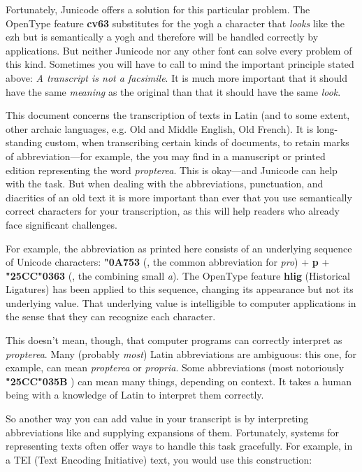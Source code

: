 Fortunately, Junicode offers a solution for this particular problem. The OpenType feature \textbf{cv63} substitutes for
the yogh a character that \textit{looks} like the ezh but is semantically a yogh and therefore will be
handled correctly by applications. But neither Junicode nor any other font can solve every problem of this kind.
Sometimes you will have to call to mind the important principle stated above: \textit{A transcript is not a
facsimile}. It is much more important that it should have the same \textit{meaning} as the original than
that it should have the same \textit{look}.

This document concerns the transcription of texts in Latin (and to some extent, other archaic languages, e.g. Old and
Middle English, Old French). It is long-standing custom, when transcribing certain kinds of documents, to retain marks
of abbreviation---for example, the \textbf{} you may find in a manuscript or printed edition representing
the word \textit{propterea}. This is okay---and Junicode can help with the task. But when dealing with the
abbreviations, punctuation, and diacritics of an old text it is more important than ever that you use semantically
correct characters for your transcription, as this will help readers who already face significant challenges.

For example, the abbreviation \textbf{} as printed here consists of an underlying sequence of Unicode
characters: \textbf{\char"0A753} (, the common abbreviation for \textit{pro}) + \textbf{p} + \textbf{\char"25CC\char"0363}
(, the combining small \textit{a}). The OpenType feature \textbf{hlig} (Historical Ligatures) has been
applied to this sequence, changing its appearance but not its underlying value. That underlying value is intelligible
to computer applications in the sense that they can recognize each character.

This doesn't mean, though, that computer programs can correctly interpret \textbf{} as
\textit{propterea}. Many (probably \textit{most}) Latin abbreviations are ambiguous: this one,
for example, can mean \textit{propterea} or \textit{propria}. Some abbreviations (most
notoriously \textbf{\char"25CC\char"035B} ) can mean many things, depending on context. It takes a human being with a
knowledge of Latin to interpret them correctly.

So another way you can add value in your transcript is by interpreting abbreviations like
\textbf{} and
supplying expansions of them. Fortunately, systems for representing texts often offer ways to handle this task
gracefully. For example, in a TEI (Text Encoding Initiative) text, you would use this construction:\\[1ex]

